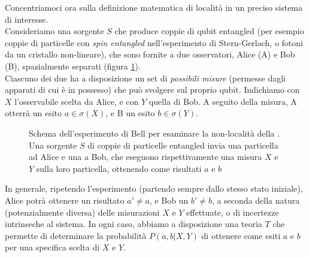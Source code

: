 \documentclass[../../InformazioneQuantistica.tex]{subfiles}
\begin{document}
Concentriamoci ora sulla definizione matematica di località in un preciso sistema di interesse\cite{Bell-nonlocality}.\\
Consideriamo una sorgente $S$ che produce coppie di qubit entangled (per esempio coppie di particelle con \textit{spin entangled} nell'esperimento di Stern-Gerlach, o fotoni  da un cristallo non-lineare), che sono fornite a due osservatori, Alice (A) e Bob (B), spazialmente separati (figura \ref{fig:Bell-setup}).\\
Ciascuno dei due ha a disposizione un set di \textit{possibili misure} (permesse dagli apparati di cui è in possesso) che può svolgere sul proprio qubit. Indichiamo con $X$ l'osservabile scelta da Alice, e con $Y$ quella di Bob. A seguito della misura, A otterrà un esito $a \in \sigma(X)$, e B un esito $b\in \sigma(Y)$.
\begin{figure}[H]
\centering

\caption{Schema dell'esperimento di Bell per esaminare la non-località della \MQ. Una sorgente $S$ di coppie di particelle entangled invia una particella ad Alice e una a Bob, che eseguono rispettivamente una misura $X$ e $Y$ sulla loro particella, ottenendo come risultati $a$ e $b$\label{fig:Bell-setup}}
\end{figure}

In generale, ripetendo l'esperimento (partendo sempre dallo stesso stato iniziale), Alice potrà ottenere un risultato $a'\neq a$, e Bob un $b'\neq b$, a seconda della natura (potenzialmente diversa) delle misurazioni $X$ e $Y$ effettuate, o di incertezze intrinseche al sistema. In ogni caso, abbiamo a disposizione una teoria $T$ che permette di determinare la probabilità $P(a,b|X,Y)$ di ottenere come esiti $a$ e $b$ per una specifica scelta di $X$ e $Y$.
\end{document}
